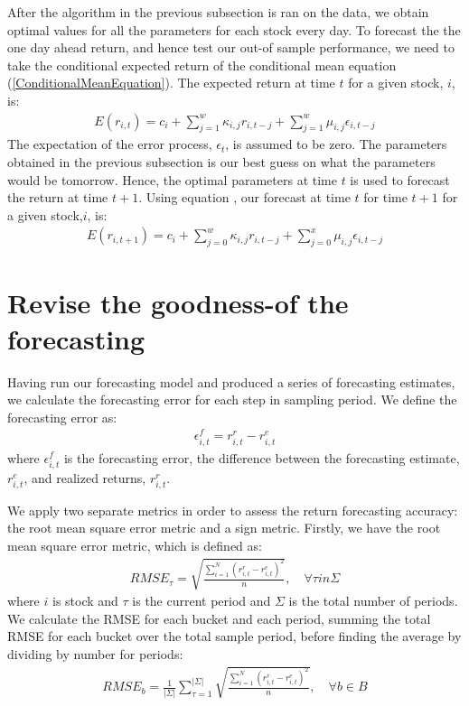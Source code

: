 After the algorithm in the previous subsection is ran on the data, we obtain optimal values for all the parameters for each stock every day. To forecast the the one day ahead return, and hence test our out-of sample performance, we need to take the conditional expected return of the conditional mean equation (\ref{ConditionalMeanEquation}). The expected return at time $t$ for a given stock, $i$, is:
\begin{align} 
    E(r_{i,t})=c_i+\sum_{j=1}^w\kappa_{i,j} r_{i,t-j}+\sum_{j=1}^w\mu_{i,j} \epsilon_{i,t-j} \label{ExpectedConditionalMean}
\end{align}
The expectation of the error process, $\epsilon_t$, is assumed to be zero. The parameters obtained in the previous subsection is our best guess on what the parameters would be tomorrow. Hence, the optimal parameters at time $t$ is used to forecast the return at time $t+1$. Using equation \label{ExpectedConditionalMean}, our forecast at time $t$ for time $t+1$ for a given stock,$i$, is:
\begin{align} 
    E(r_{i,t+1})=c_i+\sum_{j=0}^w\kappa_{i,j} r_{i,t-j}+\sum_{j=0}^x\mu_{i,j} \epsilon_{i,t-j}
\end{align}

\section*{Revise the goodness-of the forecasting}
Having run our forecasting model and produced a series of forecasting estimates, we calculate the forecasting error for each step in sampling period. We define the forecasting error as:
\begin{align}
    \epsilon_{i,t}^{f} = r_{i,t}^{r} - r_{i,t}^{e}
\end{align}
where $\epsilon_{i,t}^{f}$ is the forecasting error, the difference between the forecasting estimate, $r_{i,t}^{e}$, and realized returns, $r_{i,t}^{r}$.

We apply two separate metrics in order to assess the return forecasting accuracy: the root mean square error metric and a sign metric. Firstly, we have the root mean square error metric, which is defined as:
\begin{align}
    RMSE_{\tau} = \sqrt{\frac{\sum_{i=1}^{N}(r_{i,t}^{r} - r_{i,t}^{e})^{2}}{n}}, \quad \forall \tau in \Sigma
\end{align}
where $i$ is stock and $\tau$ is the current period and $\Sigma$ is the total number of periods. We calculate the RMSE for each bucket and each period, summing the total RMSE for each bucket over the total sample period, before finding the average by dividing by number for periods:
\begin{align}
    RMSE_{b} = \frac{1}{|\Sigma|}\sum_{\tau=1}^{|\Sigma|}\sqrt{\frac{\sum_{i=1}^{N}(r_{i,t}^{r} - r_{i,t}^{e})^{2}}{n}}, \quad \forall b \in B
\end{align}

